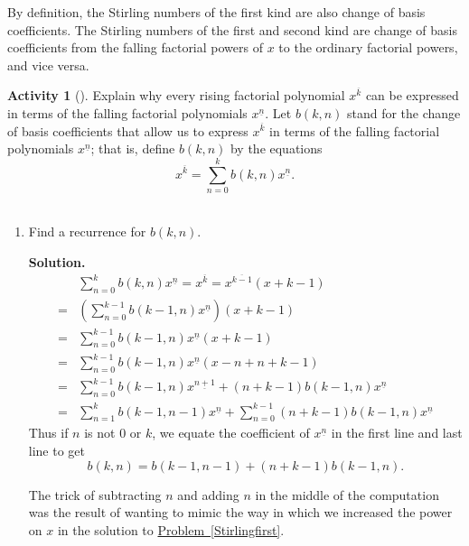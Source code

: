 \documentclass[10pt,]{book}
\theoremstyle{plain}
\theoremstyle{definition}
\newtheorem{activity}[project]{Activity}
\numberwithin{equation}{chapter}
\newcommand{\amp}{&}
\begin{document}
By definition, the Stirling numbers of the first kind are also change of basis coefficients. The Stirling numbers of the first and second kind are change of basis coefficients from the falling factorial powers of \(x\) to the ordinary factorial powers, and vice versa.%
\begin{activity}[]\label{activity-134}
Explain why every rising factorial polynomial \(x^{\overline{k}}\) can be expressed in terms of the falling factorial polynomials \(x^{\underline{n}}\). Let \(b(k,n)\) stand for the change of basis coefficients that allow us to express \(x^{\overline{k}}\) in terms of the falling factorial polynomials \(x^{\underline{n}}\); that is, define \(b(k,n)\) by the equations%
\begin{equation*}
x^{\overline{k}}=\sum_{n=0}^k b(k,n) x^{\underline{n}}.
\end{equation*}
%
~\par
\begin{enumerate}[label=(\alph*)]
 \item Find a recurrence for \(b(k,n)\).%
\par\medskip\noindent%
\textbf{Solution.}\quad %
\begin{align*}
\amp \sum_{n=0}^k b(k,n) x^{\underline{n}} = x^{\overline{k}} =
x^{\overline{k-1}}(x+k-1)\\
=\amp \left(\sum_{n=0}^{k-1} b(k-1,n) x^{\underline{n}}\right)(x+k-1)\\
=\amp \sum_{n=0}^{k-1} b(k-1,n) x^{\underline{n}}(x+k-1)\\
=\amp \sum_{n=0}^{k-1} b(k-1,n) x^{\underline{n}}(x-n+n+k-1)\\
=\amp \sum_{n=0}^{k-1} b(k-1,n) x^{\underline{n+1}} +(n+k-1)b(k-1,n)
x^{\underline{n}}\\
=\amp \sum_{n=1}^k b(k-1,n-1)x^{\underline{n}} +\sum_{n=0}^{k-1}
(n+k-1)b(k-1,n)x^{\underline{n}}
\end{align*}
Thus if \(n\) is not 0 or \(k\), we equate the coefficient of \(x^{\underline{n}}\) in the first line and last line to get%
\begin{equation*}
b(k,n) =
b(k-1,n-1) + (n+k-1)b(k-1,n).
\end{equation*}
%
\par
The trick of subtracting \(n\) and adding \(n\) in the middle of the computation was the result of wanting to mimic the way in which we increased the power on \(x\) in the solution to \hyperref[Stirlingfirst]{Problem~\ref{Stirlingfirst}}.%


\end{enumerate}
\end{activity}
\end{document}
